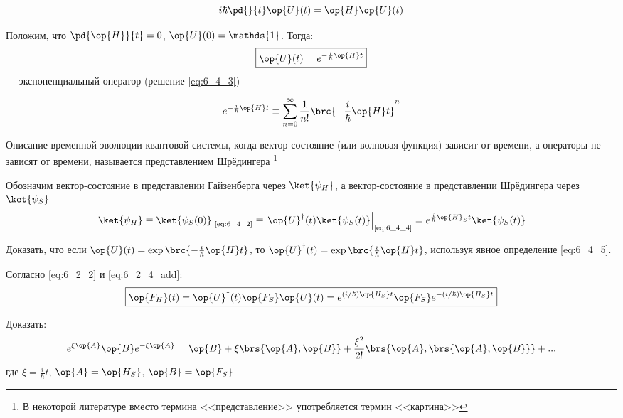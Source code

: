 \begin{equation}
\label{eq:6_4_3}
	i\hbar \pd{}{t} \op{U}(t) = \op{H}\op{U}(t)
\end{equation}

Положим, что $\pd{\op{H}}{t} = 0$, $\op{U}(0)=\mathds{1}$. Тогда:
\begin{equation}
\label{eq:6_4_4}
	\boxed{\op{U}(t)=e^{-\frac{i}{\hbar} \op{H}t}}
\end{equation}
--- экспоненциальный оператор (решение \eqref{eq:6_4_3})

\begin{defn}
\begin{equation}
\label{eq:6_4_5}
e^{-\frac{i}{\hbar} \op{H}t} \equiv \sum_{n=0}^{\infty} \frac{1}{n!} \brc{-\frac{i}{\hbar} \op{H}t}^n
\end{equation}
\end{defn}

\begin{defn}
Описание временной эволюции квантовой системы, когда вектор-состояние (или волновая функция) зависит от времени, а операторы не зависят от времени, называется \underline{представлением Шрёдингера} \footnote{В некоторой литературе вместо термина <<представление>> употребляется термин <<картина>>}
\end{defn}

Обозначим вектор-состояние в представлении Гайзенберга через $\ket{\psi_H}$, а вектор-состояние в представлении Шрёдингера через $\ket{\psi_S}$
\begin{equation}
\label{eq:6_4_6}
	\left. \ket{\psi_H} \equiv \ket{\psi_S(0)} \right|_\text{\eqref{eq:6_4_2}} \equiv 
	\left.  \op{U}^\dag(t) \ket{\psi_S(t)} \right|_\text{\eqref{eq:6_4_4}} =
	e^{\frac{i}{\hbar}\op{H}_St} \ket{\psi_S(t)}
\end{equation}

\begin{excr}
Доказать, что если $\op{U}(t)=\exp\brc{-\frac{i}{\hbar}\op{H}t}$, то $\op{U}^\dag(t) = \exp\brc{\frac{i}{\hbar}\op{H}t}$, используя явное определение \eqref{eq:6_4_5}.
\end{excr}

Согласно \eqref{eq:6_2_2} и \eqref{eq:6_2_4_add}:
\begin{equation}
\label{eq:6_4_7}
\boxed{
	\op{F_H}(t) = \op{U}^\dag(t) \op{F_S} \op{U}(t) = e^{(i/\hbar) \op{H_S}t} \op{F_S} e^{-(i/\hbar) \op{H_S}t}
}
\end{equation}

\begin{excr}
Доказать:
$$
e^{\xi \op{A}} \op{B} e^{-\xi \op{A}} = \op{B} + \xi \brs{\op{A}, \op{B}} + \frac{\xi^2}{2!} \brs{\op{A}, \brs{\op{A}, \op{B}}} + ...
$$
где $\xi = \frac{i}{\hbar} t$, $\op{A} = \op{H_S}$, $\op{B} = \op{F_S}$
\end{excr}

